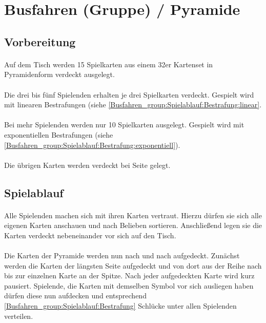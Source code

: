 \section{Busfahren (Gruppe) / Pyramide}
\subsection{Vorbereitung}
\paragraph{}
Auf dem Tisch werden 15 Spielkarten aus einem 32er Kartenset in Pyramidenform verdeckt ausgelegt.

\paragraph{}
Die drei bis fünf Spielenden erhalten je drei Spielkarten verdeckt. Gespielt wird mit linearen Bestrafungen (siehe \ref{Busfahren_group:Spielablauf:Bestrafung:linear}.

\paragraph{}
Bei mehr Spielenden werden nur 10 Spielkarten ausgelegt. Gespielt wird mit exponentiellen Bestrafungen (siehe \ref{Busfahren_group:Spielablauf:Bestrafung:exponentiell}).

\paragraph{}
Die übrigen Karten werden verdeckt bei Seite gelegt.

\subsection{Spielablauf}
\paragraph{}
Alle Spielenden machen sich mit ihren Karten vertraut.
Hierzu dürfen sie sich alle eigenen Karten anschauen und nach Belieben sortieren.
Anschließend legen sie die Karten verdeckt nebeneinander vor sich auf den Tisch.

\paragraph{}
Die Karten der Pyramide werden nun nach und nach aufgedeckt.
Zunächst werden die Karten der längsten Seite aufgedeckt und von dort aus der Reihe nach bis zur einzelnen Karte an der Spitze.
Nach jeder aufgedeckten Karte wird kurz pausiert.
Spielende, die Karten mit demselben Symbol vor sich ausliegen haben dürfen diese nun aufdecken und entsprechend \ref{Busfahren_group:Spielablauf:Bestrafung} Schlücke unter allen Spielenden verteilen.

